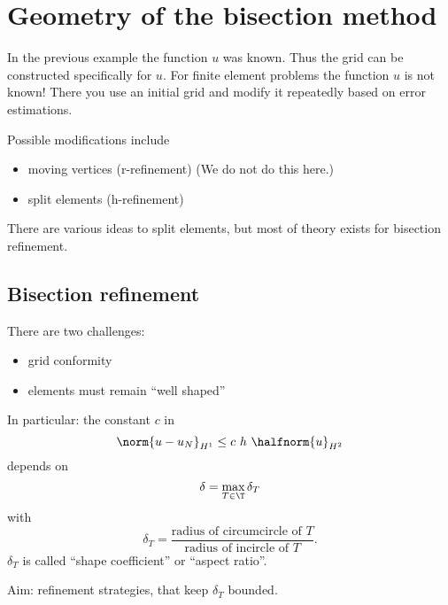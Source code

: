 
\chapter{Geometry of the bisection method}
In the previous example the function $u$ was known. Thus the grid can be constructed specifically for $u$. For finite element problems the function $u $ is not known! There you use an initial grid and modify it repeatedly based on error estimations.

Possible modifications include
\begin{itemize}
  \item moving vertices (r-refinement) (We do not do this here.)
	\item split elements (h-refinement)
\end{itemize}
There are various ideas to split elements, but most of theory exists for bisection refinement.
\section{Bisection refinement}

There are two challenges:
\begin{itemize}
	\item grid conformity
	
\item elements must remain \enquote{well shaped}
	
\end{itemize}
In particular: the constant $c$ in
\begin{equation*}
  \norm{u - u_{N}}_{H^{1}} \leq c\ h\ \halfnorm{u}_{H^{2}}
\end{equation*}
depends on
\begin{equation*}
  \delta = \max_{T \in \T} \delta_{T}
\end{equation*}
with
\begin{equation*}
	\delta_{T}= \frac{\text{radius of circumcircle of }T}{\text{radius of incircle of }T}.
\end{equation*}
$\delta_{T}$ is called \enquote{shape coefficient} or \enquote{aspect ratio}.

Aim: refinement strategies, that keep $\delta_{T}$ bounded.
